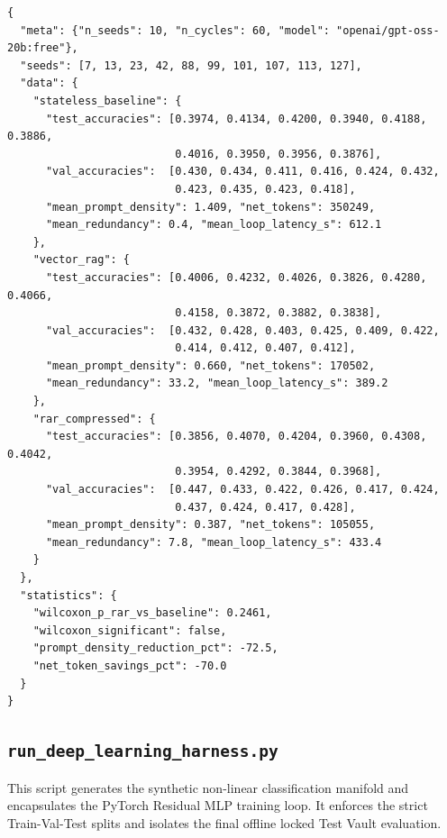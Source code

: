 \documentclass[conference]{IEEEtran}
\begin{document}
\begin{lstlisting}[language={},basicstyle=\ttfamily\tiny,
    caption={Raw pilot\_results.json output},label=lst:pilot_json]
{
  "meta": {"n_seeds": 10, "n_cycles": 60, "model": "openai/gpt-oss-20b:free"},
  "seeds": [7, 13, 23, 42, 88, 99, 101, 107, 113, 127],
  "data": {
    "stateless_baseline": {
      "test_accuracies": [0.3974, 0.4134, 0.4200, 0.3940, 0.4188, 0.3886,
                          0.4016, 0.3950, 0.3956, 0.3876],
      "val_accuracies":  [0.430, 0.434, 0.411, 0.416, 0.424, 0.432,
                          0.423, 0.435, 0.423, 0.418],
      "mean_prompt_density": 1.409, "net_tokens": 350249,
      "mean_redundancy": 0.4, "mean_loop_latency_s": 612.1
    },
    "vector_rag": {
      "test_accuracies": [0.4006, 0.4232, 0.4026, 0.3826, 0.4280, 0.4066,
                          0.4158, 0.3872, 0.3882, 0.3838],
      "val_accuracies":  [0.432, 0.428, 0.403, 0.425, 0.409, 0.422,
                          0.414, 0.412, 0.407, 0.412],
      "mean_prompt_density": 0.660, "net_tokens": 170502,
      "mean_redundancy": 33.2, "mean_loop_latency_s": 389.2
    },
    "rar_compressed": {
      "test_accuracies": [0.3856, 0.4070, 0.4204, 0.3960, 0.4308, 0.4042,
                          0.3954, 0.4292, 0.3844, 0.3968],
      "val_accuracies":  [0.447, 0.433, 0.422, 0.426, 0.417, 0.424,
                          0.437, 0.424, 0.417, 0.428],
      "mean_prompt_density": 0.387, "net_tokens": 105055,
      "mean_redundancy": 7.8, "mean_loop_latency_s": 433.4
    }
  },
  "statistics": {
    "wilcoxon_p_rar_vs_baseline": 0.2461,
    "wilcoxon_significant": false,
    "prompt_density_reduction_pct": -72.5,
    "net_token_savings_pct": -70.0
  }
}
\end{lstlisting}

\subsection{\texttt{run\_deep\_learning\_harness.py}}
This script generates the synthetic non-linear classification manifold and encapsulates the PyTorch Residual MLP training loop. It enforces the strict Train-Val-Test splits and isolates the final offline locked Test Vault evaluation.
\end{document}
